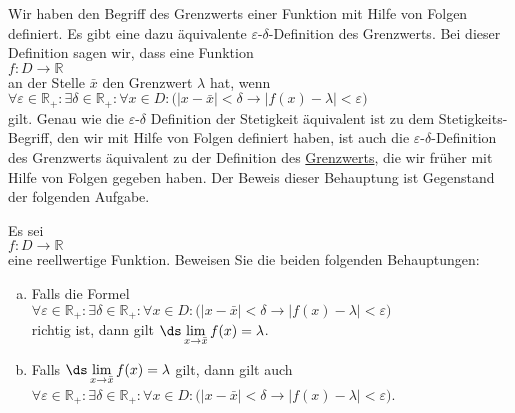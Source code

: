 \remark
Wir haben den Begriff des Grenzwerts einer Funktion mit Hilfe von Folgen definiert.  Es gibt eine
dazu \"aquivalente $\varepsilon$-$\delta$-Definition des Grenzwerts.  Bei dieser Definition sagen wir,
dass eine Funktion
\\[0.2cm]
\hspace*{1.3cm}
$f: D \rightarrow \mathbb{R}$
\\[0.2cm]
an der Stelle $\bar{x}$ den Grenzwert $\lambda$ hat, wenn
\\[0.2cm]
\hspace*{1.3cm}
$\forall \varepsilon\in\mathbb{R}_+: \exists\delta\in\mathbb{R}_+: \forall x\in D:\bigl(|x-\bar{x}|<\delta \rightarrow |f(x) - \lambda| < \varepsilon\bigr)$
\\[0.2cm]
gilt.  Genau wie die $\varepsilon$-$\delta$ Definition der Stetigkeit \"aquivalent ist zu dem
Stetigkeits-Begriff, den wir mit Hilfe von Folgen definiert haben, ist auch die
$\varepsilon$-$\delta$-Definition des Grenzwerts \"aquivalent zu der Definition des
\href{http://de.wikipedia.org/wiki/Grenzwert_(Funktion)}{Grenzwerts}, die wir 
fr\"uher mit Hilfe von Folgen gegeben haben.  Der Beweis dieser Behauptung ist Gegenstand der 
folgenden Aufgabe.
\pagebreak

\exercise
Es sei \\[0.2cm]
\hspace*{1.3cm}
$f: D \rightarrow \mathbb{R}$
\\[0.2cm]
eine reellwertige Funktion.  Beweisen Sie die beiden folgenden Behauptungen:
\begin{enumerate}[(a)]
\item Falls die Formel
      \\[0.2cm]
      \hspace*{1.3cm}
      $\forall \varepsilon\in\mathbb{R}_+: \exists\delta\in\mathbb{R}_+: \forall x\in D:\bigl(|x-\bar{x}|<\delta \rightarrow |f(x) - \lambda| < \varepsilon\bigr)$
      \\[0.2cm]
      richtig ist, dann gilt
      $\ds \lim\limits_{x\rightarrow\bar{x}} f(x) = \lambda$.
\item Falls  $\ds \lim\limits_{x\rightarrow\bar{x}} f(x) = \lambda$ gilt, dann gilt auch
      \\[0.2cm]
      \hspace*{1.3cm}
      $\forall \varepsilon\in\mathbb{R}_+: \exists\delta\in\mathbb{R}_+: \forall x\in D:\bigl(|x-\bar{x}|<\delta \rightarrow |f(x) - \lambda| < \varepsilon\bigr)$.
      \eox
\end{enumerate}



